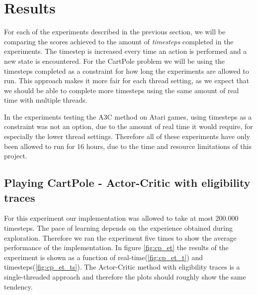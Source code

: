 \documentclass[11pt]{article}
\begin{document}
\section{Results}

For each of the experiments described in the previous section, we will be comparing the
scores achieved to the amount of \textit{timesteps} completed in the experiments.
The timestep is increased every time an action is performed and a new state is encountered.
For the CartPole problem we will be using the timesteps completed as a constraint for
how long the experiments are allowed to run.
This approach makes it more fair for each thread setting, as we expect 
that we should be able to complete more timesteps using the same amount of real time
with multiple threads.

In the experiments testing the A3C method on Atari games, using timesteps as a constraint
was not an option, due to the amount of real time it would require, for especially the lower thread settings.
Therefore all of these experiments have only been allowed to run for 16 hours,
due to the time and resource limitations of this project.

\subsection{Playing CartPole - Actor-Critic with eligibility traces}

For this experiment our implementation was allowed to take at most 200.000 timesteps.
The pace of learning depends on the experience obtained during exploration.
Therefore we ran the experiment five times to show the average performance of
the implementation.
In figure \ref{fig:cp_et} the results of the experiment is shown
as a function of real-time(\ref{fig:cp_et_t}) and timesteps(\ref{fig:cp_et_ts}).
The Actor-Critic method with eligibility traces is a single-threaded
approach and therefore the plots should roughly show the same tendency.
\end{document}
